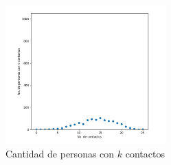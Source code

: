 \begin{figure}[htb]
    \centering
    \includegraphics[width=0.55\textwidth]{Graphics/Contactos_Pers_1000.png}
    \caption{Cantidad de personas con $k$ contactos}
\end{figure}

